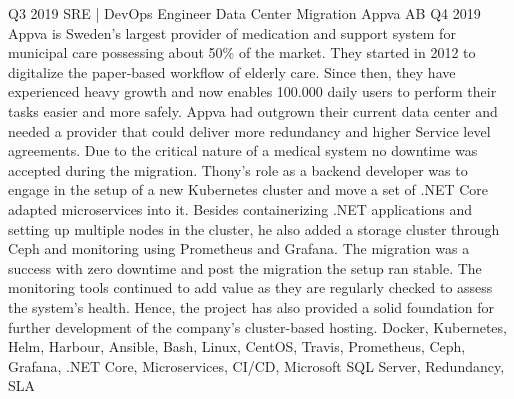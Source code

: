 \begin{experiences}
    \experience
    {Q3 2019}   
    {SRE | DevOps Engineer}
    {Data Center Migration}
    {Appva AB}
    {Q4 2019} {
        Appva is Sweden’s largest provider of medication and support system for municipal care possessing about 50\% of the market.
        They started in 2012 to digitalize the paper-based workflow of elderly care.
        Since then, they have experienced heavy growth and now enables 100.000 daily users to perform their tasks easier and more safely.
        \newline \newline
        Appva had outgrown their current data center and needed a provider that could deliver more redundancy and higher Service level agreements.
        Due to the critical nature of a medical system no downtime was accepted during the migration.
        \newline \newline
        Thony’s role as a backend developer was to engage in the setup of a new Kubernetes cluster and move a set of .NET Core adapted microservices into it.
        Besides containerizing .NET applications and setting up multiple nodes in the cluster, he also added a storage cluster through Ceph and monitoring using Prometheus and Grafana.
        The migration was a success with zero downtime and post the migration the setup ran stable.
        The monitoring tools continued to add value as they are regularly checked to assess the system's health.
        Hence, the project has also provided a solid foundation for further development of the company's cluster-based hosting.
        \newline
    }
    {Docker, Kubernetes, Helm, Harbour, Ansible, Bash, Linux, CentOS, Travis, Prometheus, Ceph, Grafana, .NET Core, Microservices, CI/CD, Microsoft SQL Server, Redundancy, SLA}
    \emptySeparator
    

\end{experiences}

